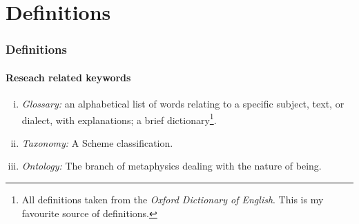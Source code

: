 \section{Definitions}

\begin{frame}
    \frametitle{Definitions}
    \framesubtitle{Reseach related keywords}
    \begin{enumerate}[i)]
    	\item \emph{Glossary: } an alphabetical list of words relating to a specific subject, text, or dialect, with explanations; a brief dictionary\footnote{\label{note} All definitions taken from the \emph{Oxford Dictionary of English}. This is my favourite source of definitions.}.
    	\item \emph{Taxonomy: } A Scheme classification.
    	\item \emph{Ontology: } The branch of metaphysics dealing with the nature of being.
    \end{enumerate}
\end{frame}